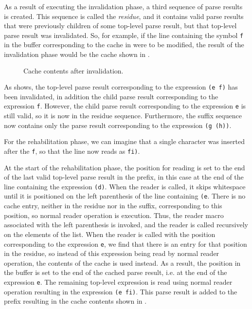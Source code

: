 As a result of executing the invalidation phase, a third sequence of
parse results is created.  This sequence is called the \emph{residue},
and it contains valid parse results that were previously children of
some top-level parse result, but that top-level parse result was
invalidated.  So, for example, if the line containing the symbol
\texttt{f} in the buffer corresponding to the cache in
 were to be modified, the result of the invalidation
phase would be the cache shown in .

\begin{figure}
\begin{center}
\end{center}
\caption{\label{fig-after-invalidation}
Cache contents after invalidation.}
\end{figure}

As  shows, the top-level parse result
corresponding to the expression \texttt{(e f)} has been invalidated,
in addition the child parse result corresponding to the expression
\texttt{f}.  However, the child parse result corresponding to the
expression \texttt{e} is still valid, so it is now in the residue
sequence.  Furthermore, the suffix sequence now contains only the
parse result corresponding to the expression \texttt{(g (h))}.

For the rehabilitation phase, we can imagine that a single character
was inserted after the \texttt{f}, so that the line now reads as
\texttt{fi)}.

At the start of the rehabilitation phase, the position for reading is
set to the end of the last valid top-level parse result in the prefix,
in this case at the end of the line containing the expression
\texttt{(d)}.  When the reader is called, it skips whitespace until it
is positioned on the left parenthesis of the line containing
\texttt{(e}.  There is no cache entry, neither in the residue nor in
the suffix, corresponding to this position, so normal reader operation
is execution.  Thus, the reader macro associated with the left
parenthesis is invoked, and the reader is called recursively on the
elements of the list.  When the reader is called with the position
corresponding to the expression \texttt{e}, we find that there is an
entry for that position in the residue, so instead of this expression
being read by normal reader operation, the contents of the cache is
used instead.  As a result, the position in the buffer is set to the
end of the cached parse result, i.e. at the end of the expression
\texttt{e}.  The remaining top-level expression is read using normal
reader operation resulting in the expression \texttt{(e fi)}.  This
parse result is added to the prefix resulting in the cache contents
shown in .

